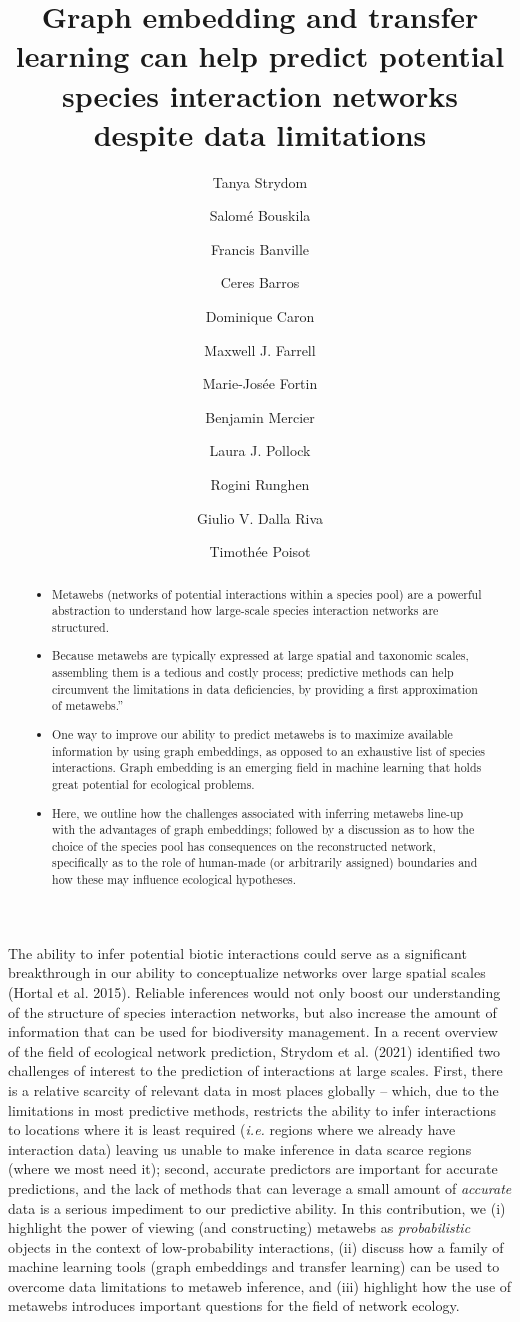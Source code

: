 \documentclass[
  letterpaper,
  DIV=11,
  numbers=noendperiod]{scrartcl}
\title{Graph embedding and transfer learning can help predict potential
species interaction networks despite data limitations}
\author{Tanya Strydom \and Salomé Bouskila \and Francis
Banville \and Ceres Barros \and Dominique Caron \and Maxwell J.
Farrell \and Marie-Josée Fortin \and Benjamin Mercier \and Laura J.
Pollock \and Rogini Runghen \and Giulio V. Dalla Riva \and Timothée
Poisot}
\date{}
\providecommand{\tightlist}{%
  \setlength{\itemsep}{0pt}\setlength{\parskip}{0pt}}\usepackage{longtable,booktabs,array}
\begin{document}
\maketitle
\begin{abstract}
\begin{itemize}
\tightlist
\item
  Metawebs (networks of potential interactions within a species pool)
  are a powerful abstraction to understand how large-scale species
  interaction networks are structured.
\item
  Because metawebs are typically expressed at large spatial and
  taxonomic scales, assembling them is a tedious and costly process;
  predictive methods can help circumvent the limitations in data
  deficiencies, by providing a first approximation of metawebs.''
\item
  One way to improve our ability to predict metawebs is to maximize
  available information by using graph embeddings, as opposed to an
  exhaustive list of species interactions. Graph embedding is an
  emerging field in machine learning that holds great potential for
  ecological problems.
\item
  Here, we outline how the challenges associated with inferring metawebs
  line-up with the advantages of graph embeddings; followed by a
  discussion as to how the choice of the species pool has consequences
  on the reconstructed network, specifically as to the role of
  human-made (or arbitrarily assigned) boundaries and how these may
  influence ecological hypotheses.
\end{itemize}
\end{abstract}
The ability to infer potential biotic interactions could serve as a
significant breakthrough in our ability to conceptualize networks over
large spatial scales (Hortal et al. 2015). Reliable inferences would not
only boost our understanding of the structure of species interaction
networks, but also increase the amount of information that can be used
for biodiversity management. In a recent overview of the field of
ecological network prediction, Strydom et al. (2021) identified two
challenges of interest to the prediction of interactions at large
scales. First, there is a relative scarcity of relevant data in most
places globally -- which, due to the limitations in most predictive
methods, restricts the ability to infer interactions to locations where
it is least required (\emph{i.e.} regions where we already have
interaction data) leaving us unable to make inference in data scarce
regions (where we most need it); second, accurate predictors are
important for accurate predictions, and the lack of methods that can
leverage a small amount of \emph{accurate} data is a serious impediment
to our predictive ability. In this contribution, we (i) highlight the
power of viewing (and constructing) metawebs as \emph{probabilistic}
objects in the context of low-probability interactions, (ii) discuss how
a family of machine learning tools (graph embeddings and transfer
learning) can be used to overcome data limitations to metaweb inference,
and (iii) highlight how the use of metawebs introduces important
questions for the field of network ecology.
\end{document}
